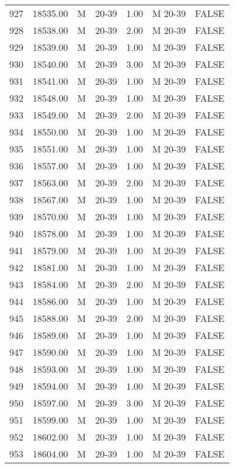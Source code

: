 \begin{table}[ht]
\begin{tabular}{rrllrll}
  927 & 18535.00 & M & 20-39 & 1.00 & M 20-39 & FALSE \\ 
  928 & 18538.00 & M & 20-39 & 2.00 & M 20-39 & FALSE \\ 
  929 & 18539.00 & M & 20-39 & 1.00 & M 20-39 & FALSE \\ 
  930 & 18540.00 & M & 20-39 & 3.00 & M 20-39 & FALSE \\ 
  931 & 18541.00 & M & 20-39 & 1.00 & M 20-39 & FALSE \\ 
  932 & 18548.00 & M & 20-39 & 1.00 & M 20-39 & FALSE \\ 
  933 & 18549.00 & M & 20-39 & 2.00 & M 20-39 & FALSE \\ 
  934 & 18550.00 & M & 20-39 & 1.00 & M 20-39 & FALSE \\ 
  935 & 18551.00 & M & 20-39 & 1.00 & M 20-39 & FALSE \\ 
  936 & 18557.00 & M & 20-39 & 1.00 & M 20-39 & FALSE \\ 
  937 & 18563.00 & M & 20-39 & 2.00 & M 20-39 & FALSE \\ 
  938 & 18567.00 & M & 20-39 & 1.00 & M 20-39 & FALSE \\ 
  939 & 18570.00 & M & 20-39 & 1.00 & M 20-39 & FALSE \\ 
  940 & 18578.00 & M & 20-39 & 1.00 & M 20-39 & FALSE \\ 
  941 & 18579.00 & M & 20-39 & 1.00 & M 20-39 & FALSE \\ 
  942 & 18581.00 & M & 20-39 & 1.00 & M 20-39 & FALSE \\ 
  943 & 18584.00 & M & 20-39 & 2.00 & M 20-39 & FALSE \\ 
  944 & 18586.00 & M & 20-39 & 1.00 & M 20-39 & FALSE \\ 
  945 & 18588.00 & M & 20-39 & 2.00 & M 20-39 & FALSE \\ 
  946 & 18589.00 & M & 20-39 & 1.00 & M 20-39 & FALSE \\ 
  947 & 18590.00 & M & 20-39 & 1.00 & M 20-39 & FALSE \\ 
  948 & 18593.00 & M & 20-39 & 1.00 & M 20-39 & FALSE \\ 
  949 & 18594.00 & M & 20-39 & 1.00 & M 20-39 & FALSE \\ 
  950 & 18597.00 & M & 20-39 & 3.00 & M 20-39 & FALSE \\ 
  951 & 18599.00 & M & 20-39 & 1.00 & M 20-39 & FALSE \\ 
  952 & 18602.00 & M & 20-39 & 1.00 & M 20-39 & FALSE \\ 
  953 & 18604.00 & M & 20-39 & 1.00 & M 20-39 & FALSE \\ 

\end{tabular}
\end{table}
